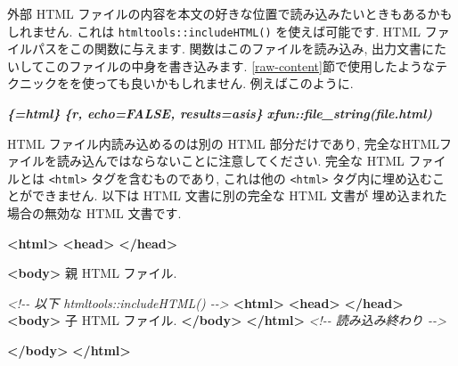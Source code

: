 \documentclass[
  11pt,
]{bxjsreport}
\newenvironment{Shaded}{\begin{snugshade}}{\end{snugshade}}
\newcommand{\CommentTok}[1]{\textcolor[rgb]{0.56,0.35,0.01}{\textit{#1}}}
\newcommand{\InformationTok}[1]{\textcolor[rgb]{0.56,0.35,0.01}{\textbf{\textit{#1}}}}
\newcommand{\KeywordTok}[1]{\textcolor[rgb]{0.13,0.29,0.53}{\textbf{#1}}}
\newcommand{\NormalTok}[1]{#1}
\begin{document}
外部 HTML ファイルの内容を本文の好きな位置で読み込みたいときもあるかもしれません. これは \texttt{htmltools::includeHTML()} を使えば可能です. HTML ファイルパスをこの関数に与えます. 関数はこのファイルを読み込み, 出力文書にたいしてこのファイルの中身を書き込みます. \ref{raw-content}節で使用したようなテクニックをを使っても良いかもしれません. 例えばこのように.

\begin{Shaded}
\begin{Highlighting}[]
\InformationTok{\textasciigrave{}\textasciigrave{}\textasciigrave{}\textasciigrave{}\{=html\}}
\InformationTok{\textasciigrave{}\textasciigrave{}\textasciigrave{}\{r, echo=FALSE, results=\textquotesingle{}asis\textquotesingle{}\}}
\InformationTok{xfun::file\_string(\textquotesingle{}file.html\textquotesingle{})}
\InformationTok{\textasciigrave{}\textasciigrave{}\textasciigrave{}}
\InformationTok{\textasciigrave{}\textasciigrave{}\textasciigrave{}\textasciigrave{}}
\end{Highlighting}
\end{Shaded}

HTML ファイル内読み込めるのは別の HTML 部分だけであり, 完全なHTMLファイルを読み込んではならないことに注意してください. 完全な HTML ファイルとは \texttt{\textless{}html\textgreater{}} タグを含むものであり, これは他の \texttt{\textless{}html\textgreater{}} タグ内に埋め込むことができません. 以下は HTML 文書に別の完全な HTML 文書が 埋め込まれた場合の無効な HTML 文書です.

\begin{Shaded}
\begin{Highlighting}[]
\KeywordTok{\textless{}html\textgreater{}}
  \KeywordTok{\textless{}head\textgreater{}}  \KeywordTok{\textless{}/head\textgreater{}}

  \KeywordTok{\textless{}body\textgreater{}}
\NormalTok{  親 HTML ファイル.}

  \CommentTok{\textless{}!{-}{-} 以下 htmltools::includeHTML() {-}{-}\textgreater{}}
    \KeywordTok{\textless{}html\textgreater{}}
      \KeywordTok{\textless{}head\textgreater{}}  \KeywordTok{\textless{}/head\textgreater{}}
      \KeywordTok{\textless{}body\textgreater{}}
\NormalTok{      子 HTML ファイル.}
      \KeywordTok{\textless{}/body\textgreater{}}
    \KeywordTok{\textless{}/html\textgreater{}}
  \CommentTok{\textless{}!{-}{-} 読み込み終わり {-}{-}\textgreater{}}

  \KeywordTok{\textless{}/body\textgreater{}}
\KeywordTok{\textless{}/html\textgreater{}}
\end{Highlighting}
\end{Shaded}
\end{document}
